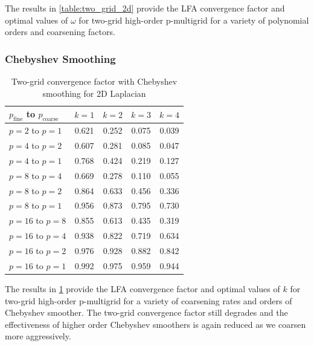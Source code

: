 \documentclass[review]{siamart190516}
\begin{document}
The results in \cref{table:two_grid_2d} provide the LFA convergence factor and optimal values of $\omega$ for two-grid high-order p-multigrid for a variety of polynomial orders and coarsening factors.

\subsubsection{Chebyshev Smoothing}

\begin{table}[ht!]
\begin{center}
\begin{tabular}{l c c c c}
  \toprule
  $p_{\text{fine}}$ to $p_{\text{coarse}}$  &  $k = 1$   &  $k = 2$   &  $k = 3$   &  $k = 4$   \\
  \toprule
  $p = 2$ to $p = 1$   &  0.621  &  0.252  &  0.075  &  0.039  \\
  \midrule
  $p = 4$ to $p = 2$   &  0.607  &  0.281  &  0.085  &  0.047  \\
  $p = 4$ to $p = 1$   &  0.768  &  0.424  &  0.219  &  0.127  \\
  \midrule
  $p = 8$ to $p = 4$   &  0.669  &  0.278  &  0.110  &  0.055  \\
  $p = 8$ to $p = 2$   &  0.864  &  0.633  &  0.456  &  0.336  \\
  $p = 8$ to $p = 1$   &  0.956  &  0.873  &  0.795  &  0.730  \\
  \midrule
  $p = 16$ to $p = 8$  &  0.855  &  0.613  &  0.435  &  0.319  \\
  $p = 16$ to $p = 4$  &  0.938  &  0.822  &  0.719  &  0.634  \\
  $p = 16$ to $p = 2$  &  0.976  &  0.928  &  0.882  &  0.842  \\
  $p = 16$ to $p = 1$  &  0.992  &  0.975  &  0.959  &  0.944  \\
  \bottomrule
\end{tabular}
\end{center}
\caption{Two-grid convergence factor with Chebyshev smoothing for 2D Laplacian}
\label{table:two_grid_2d_chebyshev}
\end{table}

The results in \cref{table:two_grid_2d_chebyshev} provide the LFA convergence factor and optimal values of $k$ for two-grid high-order p-multigrid for a variety of coarsening rates and orders of Chebyshev smoother.
The two-grid convergence factor still degrades and the effectiveness of higher order Chebyshev smoothers is again reduced as we coarsen more aggressively.
\end{document}

